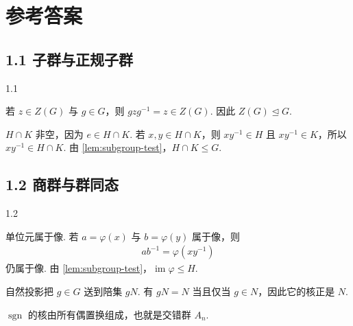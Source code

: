 
\chapter{参考答案}

\section*{1.1 子群与正规子群}

\begin{answers}{1.1}
    \item
    若 \(z\in Z(G)\) 与 \(g\in G\)，则 \(gzg^{-1}=z\in Z(G)\).
    因此 \(Z(G)\trianglelefteq G\).

    \item
    \(H\cap K\) 非空，因为 \(e\in H\cap K\).
    若 \(x,y\in H\cap K\)，则 \(xy^{-1}\in H\) 且 \(xy^{-1}\in K\)，所以 \(xy^{-1}\in H\cap K\).
    由 \autoref{lem:subgroup-test}，\(H\cap K\leq G\).
\end{answers}

\section*{1.2 商群与群同态}

\begin{answers}{1.2}
    \item
    单位元属于像.
    若 \(a=\varphi(x)\) 与 \(b=\varphi(y)\) 属于像，则
    \begin{align*}
        ab^{-1}=\varphi(xy^{-1})
    \end{align*}
    仍属于像.
    由 \autoref{lem:subgroup-test}，\(\operatorname{im}\varphi\leq H\).

    \item
    自然投影把 \(g\in G\) 送到陪集 \(gN\).
    有 \(gN=N\) 当且仅当 \(g\in N\)，因此它的核正是 \(N\).

    \item
    \(\operatorname{sgn}\) 的核由所有偶置换组成，也就是交错群 \(A_n\).
\end{answers}
